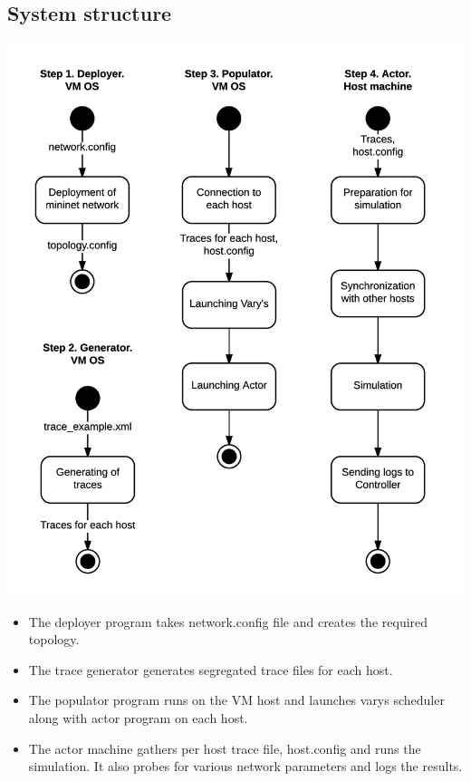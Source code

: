 \documentclass{article}
\begin{document}
\subsection{System structure}
\includegraphics[scale = 0.75]{flow_diagram}
\begin{itemize}
\item The deployer program takes network.config file and creates the required topology.
\item The trace generator generates segregated trace files for each host.
\item The populator program runs on the VM host and launches varys scheduler along with actor program on each host.
\item The actor machine gathers per host trace file, host.config and runs the simulation. It also probes for various network parameters and logs the results.
\end{itemize}
\end{document}
